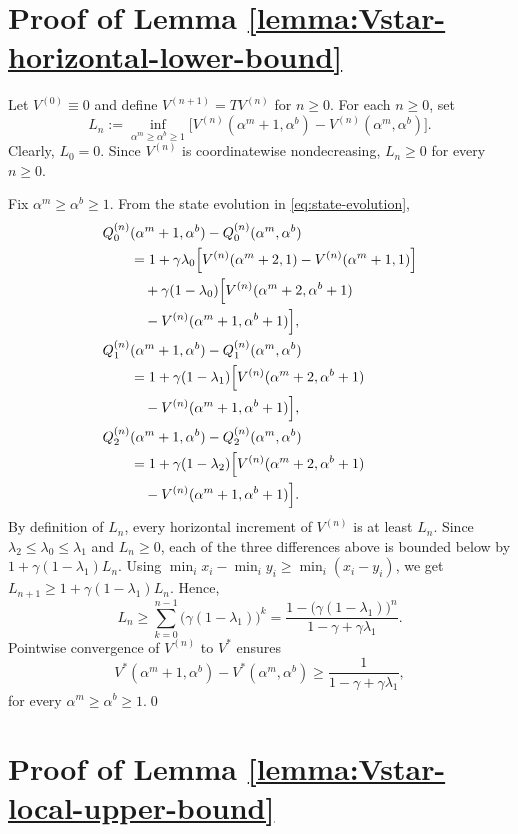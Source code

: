 \documentclass[letterpaper,journal]{IEEEtran}
\begin{document}
\section{Proof of Lemma \ref{lemma:Vstar-horizontal-lower-bound}}
\label{app:Vstar-horizontal-lower-bound}

Let $V^{(0)}\equiv 0$ and define $V^{(n+1)}=TV^{(n)}$ for $n\geq 0$. For each $n\geq 0$, set
\[
L_n:=\inf_{\alpha^m\geq \alpha^b\geq 1}\bigl[V^{(n)}(\alpha^m+1,\alpha^b)-V^{(n)}(\alpha^m,\alpha^b)\bigr].
\]
Clearly, $L_0=0$. Since $V^{(n)}$ is coordinatewise nondecreasing, $L_n\geq 0$ for every $n\geq 0$.

Fix $\alpha^m\ge \alpha^b\ge 1$. From the state evolution in
\eqref{eq:state-evolution},
\begin{align*}
Q_0^{(n)}&(\alpha^m+1,\alpha^b)-Q_0^{(n)}(\alpha^m,\alpha^b)\\
&=1+\gamma\lambda_0\Bigl[V^{(n)}(\alpha^m+2,1)-V^{(n)}(\alpha^m+1,1)\Bigr]\\
&\quad+\gamma(1-\lambda_0)\Bigl[V^{(n)}(\alpha^m+2,\alpha^b+1)\\
&\quad -V^{(n)}(\alpha^m+1,\alpha^b+1)\Bigr],\\
Q_1^{(n)}&(\alpha^m+1,\alpha^b)-Q_1^{(n)}(\alpha^m,\alpha^b)\\
&=1+\gamma(1-\lambda_1)\Bigl[V^{(n)}(\alpha^m+2,\alpha^b+1)\\
&\quad -V^{(n)}(\alpha^m+1,\alpha^b+1)\Bigr],\\
Q_2^{(n)}&(\alpha^m+1,\alpha^b)-Q_2^{(n)}(\alpha^m,\alpha^b)\\
&=1+\gamma(1-\lambda_2)\Bigl[V^{(n)}(\alpha^m+2,\alpha^b+1)\\
&\quad -V^{(n)}(\alpha^m+1,\alpha^b+1)\Bigr].
\end{align*}
By definition of $L_n$, every horizontal increment of $V^{(n)}$ is at least $L_n$. Since $\lambda_2\leq\lambda_0\leq\lambda_1$ and $L_n\geq 0$, each of the three differences above is bounded below by $1+\gamma(1-\lambda_1)L_n$.
Using $\min_i x_i-\min_i y_i\geq \min_i (x_i-y_i)$, we get $L_{n+1}\geq 1+\gamma(1-\lambda_1)L_n$. Hence,
\[
L_n\geq \sum_{k=0}^{n-1}\big(\gamma(1-\lambda_1)\big)^k
=\frac{1-\big(\gamma(1-\lambda_1)\big)^n}{1-\gamma+\gamma\lambda_1}.
\]
Pointwise convergence of $V^{(n)}$ to $V^*$ ensures
\[
V^*(\alpha^m+1,\alpha^b)-V^*(\alpha^m,\alpha^b)\geq \frac{1}{1-\gamma+\gamma\lambda_1},
\]
for every $\alpha^m\geq \alpha^b\geq 1$.\qed


\section{Proof of Lemma \ref{lemma:Vstar-local-upper-bound}}
\label{app:Vstar-local-upper-bound}
\end{document}
